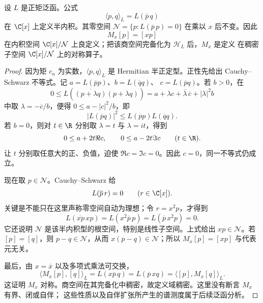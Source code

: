 \begin{proposition}[GNS 原型]\label{proposition:7-3-1-4}
设 $L$ 是正矩泛函。公式
\[
 \langle p,q\rangle_L=L(\overline p\,q)
\]
在 $\C[x]$ 上定义半内积。其零空间
$\mathcal N=\{p:L(\overline p\,p)=0\}$ 在乘以 $x$ 后不变。因此
\[
 M_x[p]=[xp]
\]
在内积空间 $\C[x]/\mathcal N$ 上良定义；把该商空间完备化为 $\mathcal H_L$ 后，$M_x$ 是定义
在稠密子空间 $\C[x]/\mathcal N$ 上的对称算子。
\end{proposition}

\begin{proof}
因为矩 $c_n$ 为实数，$\langle p,q\rangle_L$ 是 Hermitian 半正定型。正性先给出
Cauchy--Schwarz 不等式。记
$a=L(\overline p p)$、$b=L(\overline q q)$、
$c=L(\overline p q)$。若 $b>0$，在
\[
 0\leq L(\overline{(p+\lambda q)}(p+\lambda q))
 =a+\lambda c+\overline\lambda\,\overline c+|\lambda|^2b
\]
中取 $\lambda=-\overline c/b$，便得
$0\leq a-|c|^2/b$，即
\[
 |L(\overline p q)|^2
 \leq L(\overline p p)L(\overline q q).
\]
若 $b=0$，则对 $t\in\R$ 分别取 $\lambda=t$ 与 $\lambda=it$，得到
\[
 0\leq a+2t\Re c,
 \qquad
 0\leq a-2t\Im c
 \qquad(t\in\R).
\]
让 $t$ 分别取任意大的正、负值，迫使 $\Re c=\Im c=0$。因此 $c=0$，同一不等式仍成立。

现在取 $p\in\mathcal N$。Cauchy--Schwarz 给
\[
 L(\overline p\,r)=0\qquad(r\in\C[x]).
\]
关键是不能只在这里声称零空间自动为理想；令 $r=x^2p$，才得到
\[
 L(\overline{xp}\,xp)=L(x^2\overline p\,p)
 =L(\overline p\,x^2p)=0.
\]
它还说明 $\mathcal N$ 是该半内积型的根空间，特别是线性子空间。上式给出
$xp\in\mathcal N$。若 $[p]=[q]$，则 $p-q\in\mathcal N$，从而
$x(p-q)\in\mathcal N$；所以 $M_x[p]=[xp]$ 与代表元无关。

最后，由 $x=\overline x$ 以及多项式乘法可交换，
\[
 \langle M_x[p],[q]\rangle_L
 =L(x\overline p\,q)
 =L(\overline p\,xq)
 =\langle[p],M_x[q]\rangle_L.
\]
这证明 $M_x$ 对称。商空间在其完备化中稠密，故定义域稠密。这里没有断言 $M_x$ 有界、闭或自伴；
这些性质以及自伴扩张所产生的谱测度属于后续泛函分析。
\end{proof}


